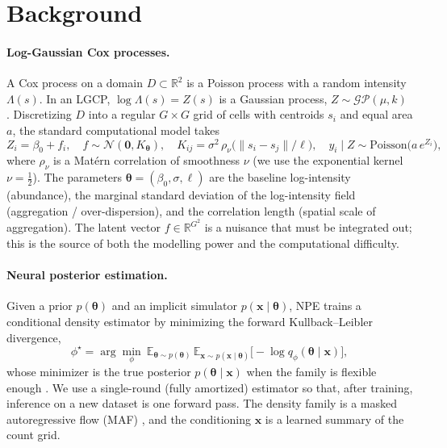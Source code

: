 \documentclass[11pt]{article}
\newcommand{\R}{\mathbb{R}}
\newcommand{\E}{\mathbb{E}}
\newcommand{\N}{\mathcal{N}}
\newcommand{\GP}{\mathcal{GP}}
\newcommand{\Pois}{\mathrm{Poisson}}
\newcommand{\thetavec}{\boldsymbol{\theta}}
\newcommand{\xvec}{\mathbf{x}}
\begin{document}
\section{Background}

\paragraph{Log-Gaussian Cox processes.}
A Cox process on a domain $D\subset\R^2$ is a Poisson process with a random
intensity $\Lambda(s)$. In an LGCP, $\log\Lambda(s)=Z(s)$ is a Gaussian process,
$Z\sim\GP(\mu,k)$ \citep{moller1998log}. Discretizing $D$ into a regular
$G\times G$ grid of cells with centroids $s_i$ and equal area $a$, the standard
computational model \citep{diggle2013spatial} takes
\begin{equation}
Z_i = \beta_0 + f_i, \quad f\sim\N(\mathbf{0},K_{\thetavec}),\quad
K_{ij}=\sigma^2\,\rho_\nu\!\big(\|s_i-s_j\|/\ell\big), \quad
y_i \mid Z \sim \Pois\!\big(a\,e^{Z_i}\big),
\label{eq:model}
\end{equation}
where $\rho_\nu$ is a Mat\'ern correlation of smoothness $\nu$ (we use the
exponential kernel $\nu=\tfrac12$). The parameters
$\thetavec=(\beta_0,\sigma,\ell)$ are the baseline log-intensity (abundance),
the marginal standard deviation of the log-intensity field (aggregation /
over-dispersion), and the correlation length (spatial scale of aggregation). The
latent vector $f\in\R^{G^2}$ is a nuisance that must be integrated out; this is
the source of both the modelling power and the computational difficulty.

\paragraph{Neural posterior estimation.}
Given a prior $p(\thetavec)$ and an implicit simulator $p(\xvec\mid\thetavec)$,
NPE trains a conditional density estimator by minimizing the forward
Kullback--Leibler divergence,
\begin{equation}
\phi^\star=\arg\min_\phi\ \E_{\thetavec\sim
p(\thetavec)}\,\E_{\xvec\sim p(\xvec\mid\thetavec)}
\big[-\log q_\phi(\thetavec\mid\xvec)\big],
\label{eq:npe}
\end{equation}
whose minimizer is the true posterior $p(\thetavec\mid\xvec)$ when the family is
flexible enough \citep{papamakarios2016fast,greenberg2019automatic}. We use a
single-round (fully amortized) estimator so that, after training, inference on a
new dataset is one forward pass. The density family is a masked autoregressive
flow (MAF) \citep{papamakarios2017masked}, and the conditioning $\xvec$ is a
learned summary of the count grid.
\end{document}
